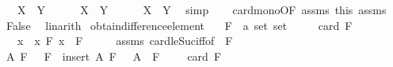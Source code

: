 \begin{isabellebody}
\ \ \ {\isachardoublequoteopen}X\ {\isacharminus}{\kern0pt}\ Y\ {\isasymnoteq}\ {\isacharbraceleft}{\kern0pt}{\isacharbraceright}{\kern0pt}{\isachardoublequoteclose}\isanewline
%
\isadelimproof
%
\endisadelimproof
%
\isatagproof
{}\isamarkupfalse%
\isanewline
\ \ \isamarkupfalse%
\ {\isachardoublequoteopen}X\ {\isacharminus}{\kern0pt}\ Y\ {\isacharequal}{\kern0pt}\ {\isacharbraceleft}{\kern0pt}{\isacharbraceright}{\kern0pt}{\isachardoublequoteclose}\isanewline
\ \ \isamarkupfalse%
\ {\isachardoublequoteopen}X\ {\isasymsubseteq}\ Y{\isachardoublequoteclose}\ \isamarkupfalse%
\ simp\isanewline
\ \ \isamarkupfalse%
\ card{\isacharunderscore}{\kern0pt}mono{\isacharbrackleft}{\kern0pt}OF\ assms{\isacharparenleft}{\kern0pt}{}{\isacharparenright}{\kern0pt}\ this{\isacharbrackright}{\kern0pt}\ assms{\isacharparenleft}{\kern0pt}{}{\isacharparenright}{\kern0pt}\ \isamarkupfalse%
\ False\ \isamarkupfalse%
\ linarith\isanewline
{}\isamarkupfalse%
%
\endisatagproof
{\isafoldproof}%
%
\isadelimproof
\isanewline
%
\endisadelimproof
\isanewline
{}\isamarkupfalse%
\ obtain{\isacharunderscore}{\kern0pt}difference{\isacharunderscore}{\kern0pt}element{\isacharcolon}{\kern0pt}\isanewline
\ \ \ F\ {\isacharcolon}{\kern0pt}{\isacharcolon}{\kern0pt}\ {\isachardoublequoteopen}{\isacharprime}{\kern0pt}a\ set\ set{\isachardoublequoteclose}\isanewline
\ \ \ {\isachardoublequoteopen}{}\ {\isasymle}\ card\ F{\isachardoublequoteclose}\isanewline
\ \ \ {\isachardoublequoteopen}x{\isachardoublequoteclose}\ \ {\isachardoublequoteopen}x{\isasymin}\ {\isasymUnion}F{\isachardoublequoteclose}\ {\isachardoublequoteopen}x\ {\isasymnotin}\ {\isasymInter}F{\isachardoublequoteclose}\isanewline
%
\isadelimproof
%
\endisadelimproof
%
\isatagproof
{}\isamarkupfalse%
\ {\isacharminus}{\kern0pt}\isanewline
\ \ \isamarkupfalse%
\ assms\ card{\isacharunderscore}{\kern0pt}le{\isacharunderscore}{\kern0pt}Suc{\isacharunderscore}{\kern0pt}iff{\isacharbrackleft}{\kern0pt}of\ {}\ F{\isacharbrackright}{\kern0pt}\ \isamarkupfalse%
\ A\ F{\isacharprime}{\kern0pt}\ \ {}{\isacharcolon}{\kern0pt}\ {\isachardoublequoteopen}F\ {\isacharequal}{\kern0pt}\ insert\ A\ F{\isacharprime}{\kern0pt}{\isachardoublequoteclose}\ \ {}{\isacharcolon}{\kern0pt}\ {\isachardoublequoteopen}A\ {\isasymnotin}\ F{\isacharprime}{\kern0pt}{\isachardoublequoteclose}\ \ {}{\isacharcolon}{\kern0pt}\ {\isachardoublequoteopen}{}\ {\isasymle}\ card\ F{\isacharprime}{\kern0pt}{\isachardoublequoteclose}\ \isamarkupfalse%

\end{isabellebody}
